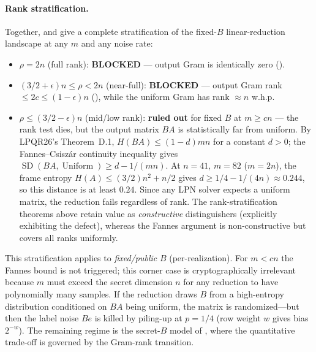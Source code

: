 \documentclass[11pt,a4paper]{article}
\theoremstyle{plain}
\theoremstyle{definition}
\begin{document}
\paragraph{Rank stratification.} Together,  and  give a complete stratification of the fixed-$B$ linear-reduction landscape at any $m$ and any noise rate:
\begin{itemize}
\item $\rho = 2n$ (full rank): \textbf{BLOCKED} --- output Gram is identically zero ().
\item $(3/2+\epsilon)n \le \rho < 2n$ (near-full): \textbf{BLOCKED} --- output Gram rank $\le 2c \le (1-\epsilon)n$ (), while the uniform Gram has rank $\approx n$ w.h.p.
\item $\rho \le (3/2-\epsilon)n$ (mid/low rank): \textbf{ruled out} for fixed $B$ at $m \ge cn$ --- the rank test dies, but the output matrix $BA$ is statistically far from uniform. By LPQR26's Theorem~D.1, $H(BA) \le (1-d)mn$ for a constant $d > 0$; the Fannes--Csisz\'{a}r continuity inequality gives $\operatorname{SD}(BA, \operatorname{Uniform}) \ge d - 1/(mn)$. At $n=41$, $m=82$ ($m=2n$), the frame entropy $H(A) \le (3/2)n^2 + n/2$ gives $d \ge 1/4 - 1/(4n) \approx 0.244$, so this distance is at least $0.24$. Since any LPN solver expects a uniform matrix, the reduction fails regardless of rank. The rank-stratification theorems above retain value as \emph{constructive} distinguishers (explicitly exhibiting the defect), whereas the Fannes argument is non-constructive but covers all ranks uniformly.
\end{itemize}
This stratification applies to \emph{fixed/public} $B$ (per-realization). For $m < cn$ the Fannes bound is not triggered; this corner case is cryptographically irrelevant because $m$ must exceed the secret dimension $n$ for any reduction to have polynomially many samples. If the reduction draws $B$ from a high-entropy distribution conditioned on $BA$ being uniform, the matrix is randomized---but then the label noise $Be$ is killed by piling-up at $p=1/4$ (row weight $w$ gives bias $2^{-w}$). The remaining regime is the secret-$B$ model of , where the quantitative trade-off is governed by the Gram-rank transition.
\end{document}

